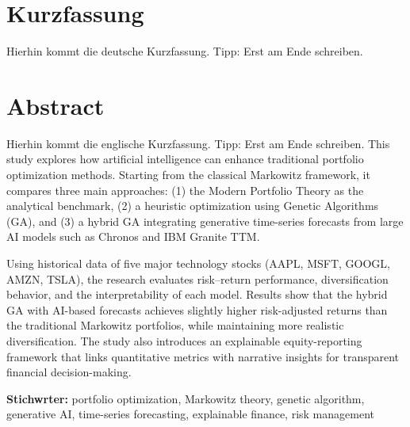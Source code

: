 \documentclass{agasthesis}
\begin{document}



\section*{Kurzfassung}
Hierhin kommt die deutsche Kurzfassung. Tipp: Erst am Ende schreiben.

\section*{Abstract}
Hierhin kommt die englische Kurzfassung. Tipp: Erst am Ende schreiben.
This study explores how artificial intelligence can enhance traditional portfolio optimization methods. 
 Starting from the classical Markowitz framework, it compares three main approaches: 
 (1) the Modern Portfolio Theory as the analytical benchmark, 
 (2) a heuristic optimization using Genetic Algorithms (GA), and 
 (3) a hybrid GA integrating generative time-series forecasts from large AI models such as Chronos and IBM Granite TTM. 

Using historical data of five major technology stocks (AAPL, MSFT, GOOGL, AMZN, TSLA), the research evaluates risk–return performance, diversification behavior, and the interpretability of each model. 
 Results show that the hybrid GA with AI-based forecasts achieves slightly higher risk-adjusted returns than the traditional Markowitz portfolios, while maintaining more realistic diversification. 
 The study also introduces an explainable equity-reporting framework that links quantitative metrics with narrative insights for transparent financial decision-making. 

\vspace{2em}
\noindent \textbf{Stichwrter:} portfolio optimization, Markowitz theory, genetic algorithm, generative AI, time-series forecasting, explainable finance, risk management

\newpage

\end{document}
